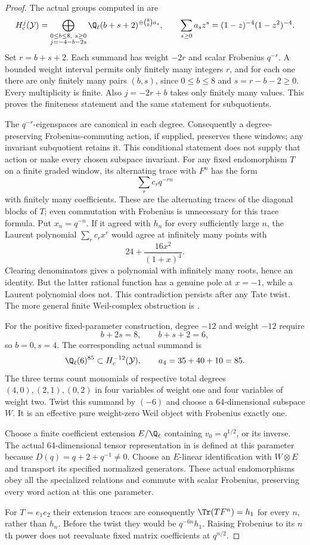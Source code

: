 \begin{proof}
The actual groups computed in  are
\[
 H_c^j(\mathcal Y)=
 \bigoplus_{\substack{0\le b\le8,\ s\ge0\\j=-4-b-2s}}
     \Q_\ell(b+s+2)^{\oplus\binom8b a_s},
 \qquad
 \sum_{s\ge0}a_s z^s=(1-z)^{-4}(1-z^2)^{-4}.
\]
Set $r=b+s+2$. Each summand has weight $-2r$ and scalar
Frobenius $q^{-r}$. A bounded weight interval permits only
finitely many integers $r$, and for each one there are only
finitely many pairs $(b,s)$, since $0\le b\le8$ and
$s=r-b-2\ge0$. Every multiplicity is finite. Also
$j=-2r+b$ takes only finitely many values. This proves the
finiteness statement and the same statement for subquotients.

The $q^{-r}$-eigenspaces are canonical in each degree.
Consequently a degree-preserving Frobenius-commuting action,
if supplied, preserves these windows; any invariant
subquotient retains it. This conditional statement does not
supply that action or make every chosen subspace invariant.
For any fixed endomorphism $T$ on a finite graded window,
its alternating trace with $F^n$ has the form
\[
 \sum_r c_r q^{-rn}
\]
with finitely many coefficients. These are the alternating
traces of the diagonal blocks of $T$; even commutation with
Frobenius is unnecessary for this trace formula.
Put $x_n=q^{-n}$. If it agreed with $h_n$ for every
sufficiently large $n$, the Laurent polynomial $\sum_r c_rx^r$
would agree at infinitely many points with
\[
 24+\frac{16x^2}{(1+x)^4}.
\]
Clearing denominators gives a polynomial with infinitely many
roots, hence an identity. But the latter rational function has
a genuine pole at $x=-1$, while a Laurent polynomial does not.
This contradiction persists after any Tate twist. The more
general finite Weil-complex obstruction is .

For the positive fixed-parameter construction, degree $-12$
and weight $-12$ require
\[
 b+2s=8,\qquad b+s+2=6,
\]
so $b=0,s=4$. The corresponding actual summand is
\[
 \Q_\ell(6)^{85}\subset H_c^{-12}(\mathcal Y),
 \qquad a_4=35+40+10=85.
\]
The three terms count monomials of respective total degrees
$(4,0),(2,1),(0,2)$ in four variables of weight one and four
variables of weight two. Twist this summand by $(-6)$ and
choose a 64-dimensional subspace $W$. It is an effective
pure weight-zero Weil object with Frobenius exactly one.

Choose a finite coefficient extension $E/\Q_\ell$ containing
$v_0=q^{1/2}$, or its inverse. The actual 64-dimensional tensor
representation in  is defined at this parameter because
$D(q)=q+2+q^{-1}\ne0$. Choose an $E$-linear identification
with $W\otimes E$ and transport its specified normalized
generators. These actual endomorphisms obey all the specialized
relations and commute with scalar Frobenius, preserving every
word action at this one parameter.

For $T=e_1e_2$ their extension traces are consequently
$\Tr(TF^n)=h_1$ for every $n$, rather than $h_n$.
Before the twist they would be $q^{-6n}h_1$.
Raising Frobenius to its $n$th power does not reevaluate fixed
matrix coefficients at $q^{n/2}$.
\end{proof}

